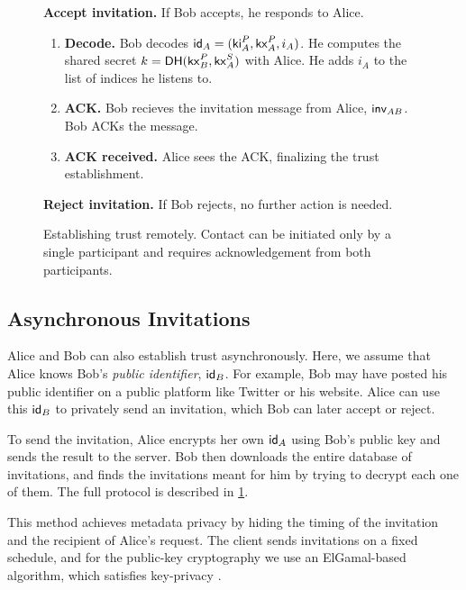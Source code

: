 \begin{figure}[th!]
\begin{framed}
{\begin{hangparas}{1em}{1}
    \medskip

      \textbf{Accept invitation.}
          If Bob accepts, he responds to Alice.
          \begin{enumerate}
              \item \textbf{Decode.} Bob decodes $\mathsf{id}_A = (\mathsf{ki}_A^P, \mathsf{kx}_A^P, i_A)$. He computes the shared secret $k =  \mathsf{DH}(\mathsf{kx}_B^P, \mathsf{kx}^S_A)$ with Alice. He adds $i_A$ to the list of indices he listens to.
              \item \textbf{ACK.} Bob recieves the invitation message from Alice, $\mathsf{inv}_{AB}$. Bob ACKs the message.
              \item \textbf{ACK received.} Alice sees the ACK, finalizing the trust establishment.
          \end{enumerate}
    \medskip
          
      \textbf{Reject invitation.}
        If Bob rejects, no further action is needed.
  \end{hangparas}
  }
  \end{framed}
  \caption{Establishing trust remotely. Contact can be initiated only by a single participant and requires acknowledgement from both participants.}
  \label{fig:trust-establishment-async}
\end{figure}


\subsection{Asynchronous Invitations}

Alice and Bob can also establish trust asynchronously. Here, we assume that Alice knows Bob's \textit{public identifier}, $\mathsf{id}_B$. For example, Bob may have posted his public identifier on a public platform like Twitter or his website. Alice can use this $\mathsf{id}_B$ to privately send an invitation, which Bob can later accept or reject. 

To send the invitation, Alice encrypts her own $\mathsf{id}_A$ using Bob's public key and sends the result to the server. Bob then downloads the entire database of invitations, and finds the invitations meant for him by trying to decrypt each one of them. The full protocol is described in \cref{fig:trust-establishment-async}.

This method achieves metadata privacy by hiding the timing of the invitation and the recipient of Alice's request. The client sends invitations on a fixed schedule, and for the public-key cryptography we use an ElGamal-based algorithm, which satisfies key-privacy \cite{bellare2001key}.
    
